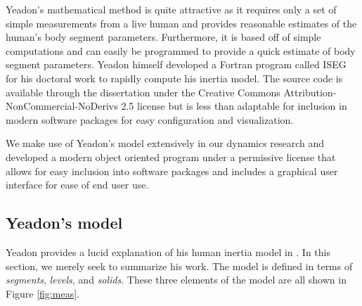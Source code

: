 \documentclass[10pt]{article}
\begin{document}
Yeadon's mathematical method is quite attractive as it requires only a set of
simple measurements from a live human and provides reasonable estimates of the
human's body segment parameters. Furthermore, it is based off of simple
computations and can easily be programmed to provide a quick estimate of body
segment parameters. Yeadon himself developed a Fortran program called ISEG for
his doctoral work \cite{Yeadon1984a} to rapidly compute his inertia model. The
source code is available through the dissertation under the Creative Commons
Attribution-NonCommercial-NoDerivs 2.5 license but is less than adaptable for
inclusion in modern software packages for easy configuration and visualization.

We make use of Yeadon's model extensively in our dynamics research and
developed a modern object oriented program under a permissive license that
allows for easy inclusion into software packages and includes a graphical user
interface for ease of end user use.

\subsection*{Yeadon's model}

Yeadon provides a lucid explanation of his human inertia model in
\cite{Yeadon1990c}. In this section, we merely seek to summarize his work. The
model is defined in terms of \emph{segments}, \emph{levels}, and \emph{solids}.
These three elements of the model are all shown in Figure \ref{fig:meas}.
\end{document}
